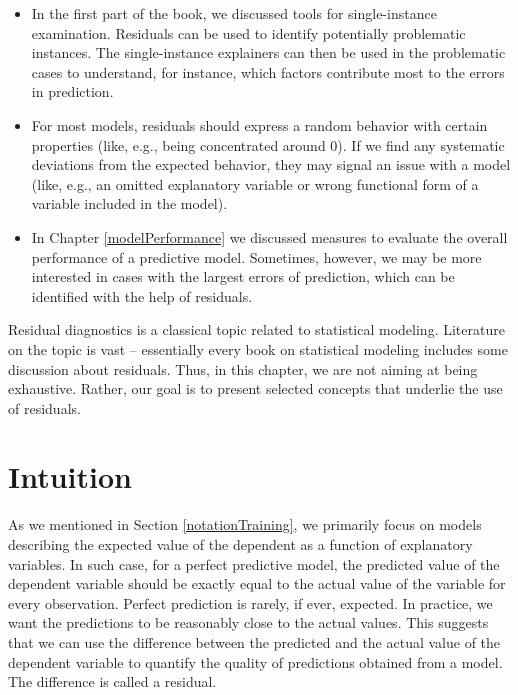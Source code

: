 \documentclass[]{krantz}
\begin{document}
\begin{itemize}
\item
  In the first part of the book, we discussed tools for single-instance examination. Residuals can be used to identify potentially problematic instances. The single-instance explainers can then be used in the problematic cases to understand, for instance, which factors contribute most to the errors in prediction.
\item
  For most models, residuals should express a random behavior with certain properties (like, e.g., being concentrated around 0). If we find any systematic deviations from the expected behavior, they may signal an issue with a model (like, e.g., an omitted explanatory variable or wrong functional form of a variable included in the model).
\item
  In Chapter \ref{modelPerformance} we discussed measures to evaluate the overall performance of a predictive model. Sometimes, however, we may be more interested in cases with the largest errors of prediction, which can be identified with the help of residuals.
\end{itemize}

Residual diagnostics is a classical topic related to statistical modeling. Literature on the topic is vast -- essentially every book on statistical modeling includes some discussion about residuals. Thus, in this chapter, we are not aiming at being exhaustive. Rather, our goal is to present selected concepts that underlie the use of residuals.

\hypertarget{IntuitionResidualDiagnostic}{%
\section{Intuition}\label{IntuitionResidualDiagnostic}}

As we mentioned in Section \ref{notationTraining}, we primarily focus on models describing the expected value of the dependent as a function of explanatory variables. In such case, for a perfect predictive model, the predicted value of the dependent variable should be exactly equal to the actual value of the variable for every observation. Perfect prediction is rarely, if ever, expected. In practice, we want the predictions to be reasonably close to the actual values. This suggests that we can use the difference between the predicted and the actual value of the dependent variable to quantify the quality of predictions obtained from a model. The difference is called a residual.
\end{document}
